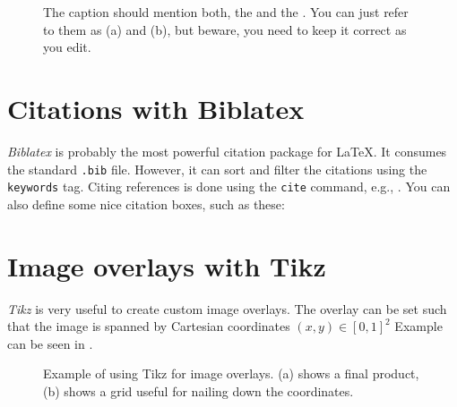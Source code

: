 \begin{figure}[!h]
  \centering
  \caption{The caption should mention both, the  and the . You can just refer to them as (a) and (b), but beware, you need to keep it correct as you edit.}
  \label{fig:uavs}
\end{figure}

\section{Citations with Biblatex}

\emph{Biblatex} is probably the most powerful citation package for LaTeX.
It consumes the standard \texttt{.bib} file. However, it can sort and filter the citations using the \texttt{keywords} tag.
Citing references is done using the \texttt{cite} command, e.g., \cite{baca2021mrs}.
You can also define some nice citation boxes, such as these:

\section{Image overlays with Tikz}

\emph{Tikz} is very useful to create custom image overlays.
The overlay can be set such that the image is spanned by Cartesian coordinates $\left(x, y\right) \in \left[0, 1\right]^2$
Example can be seen in .

\begin{figure}[!h]

  \centering

  

  \caption{Example of using Tikz for image overlays. (a) shows a final product, (b) shows a grid useful for nailing down the coordinates.}
  \label{fig:tikz_overlay}

\end{figure}
